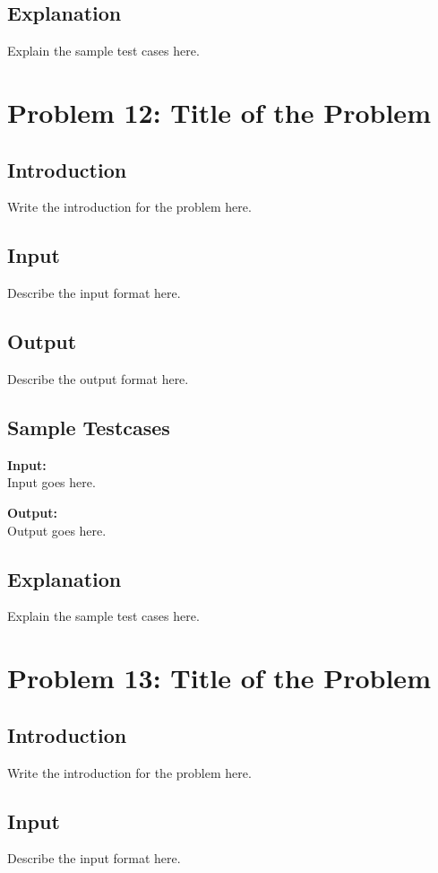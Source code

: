 \documentclass[12pt]{article}
\begin{document}
\subsection*{Explanation}
Explain the sample test cases here.

\newpage

\section*{Problem 12: Title of the Problem}

\subsection*{Introduction}
Write the introduction for the problem here.

\subsection*{Input}
Describe the input format here.

\subsection*{Output}
Describe the output format here.

\subsection*{Sample Testcases}
\textbf{Input:} \\
Input goes here.

\textbf{Output:} \\
Output goes here.

\subsection*{Explanation}
Explain the sample test cases here.

\newpage

\section*{Problem 13: Title of the Problem}

\subsection*{Introduction}
Write the introduction for the problem here.

\subsection*{Input}
Describe the input format here.
\end{document}
